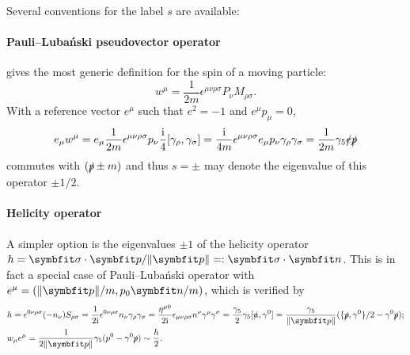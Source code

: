 \documentclass{CheatSheet}
\newcommand{\Lubanski}{Luba\'nski\xspace}
\begin{document}
Several conventions for the label $s$ are available:\vspace{-1em}
\begin{DownPara}
\paragraph{Pauli--\Lubanski pseudovector operator} gives the most generic definition for the spin of a moving particle:
\begin{equation}
 w^\mu = \frac1{2m}\epsilon^{\mu\nu\rho\sigma}P_\nu M_{\rho\sigma}.
\end{equation}
With a reference vector $e^\mu$ such that $e^2=-1$ and $e^\mu p_\mu=0$,
\begin{equation}
 e_\mu w^\mu
= e_\mu \frac1{2m} \epsilon^{\mu\nu\rho\sigma}p_\nu \frac{{\mathrm{i}}}{4}[\gamma_\rho,\gamma_\sigma]
= \frac{{\mathrm{i}}}{4m} \epsilon^{\mu\nu\rho\sigma}e_\mu p_\nu \gamma_\rho\gamma_\sigma
= \frac1{2m}\gamma_5 \slashed e \slashed p
\end{equation}
commutes with $(\slashed p\pm m)$ and thus $s=\pm$ may denote the eigenvalue of this operator $\pm1/2$.


\paragraph{Helicity operator}
A simpler option is the eigenvalues $\pm1$ of the helicity operator $h=\vc\sigma\cdot\vc p/\|\vc p\|=:\vc\sigma\cdot\vc n$.
This is in fact a special case of Pauli--\Lubanski operator with $e^\mu= (\|\vc p\|/m,p_0\vc n/m)$, which is verified by
\begin{align}
& h
=\epsilon^{0\nu\rho\sigma}(-n_\nu) S_{\rho\sigma}
=\frac{1}{2\ii}\epsilon^{0\nu\rho\sigma}n_\nu \gamma_\rho\gamma_\sigma
=\frac{\eta^{\mu0}}{2\ii}\epsilon_{\mu\nu\rho\sigma}n^\nu \gamma^\rho\gamma^\sigma
=\frac{\gamma_5}{2}\gamma_5[\slashed{n},\gamma^0]
=\frac{\gamma_5}{\|\vc p\|}({\{\slashed{p},\gamma^0\}}/{2}-\gamma^0\slashed{p});
\\&
w_\mu e^\mu 
=\frac{1}{2\|\vc p\|}\gamma_5(p^0-\gamma^0\slashed{p})\sim \frac{h}{2}.
\end{align}



\end{DownPara}
\end{document}
